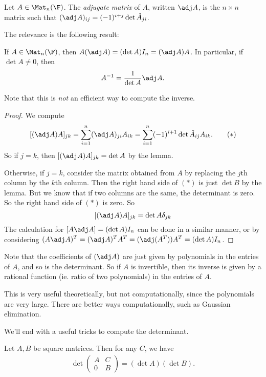 \documentclass[a4paper]{article}
\begin{document}
\begin{defi}
  Let $A \in \Mat_n(\F)$. The \emph{adjugate matrix} of $A$, written $\adj A$, is the $n\times n$ matrix such that $(\adj A)_{ij} = (-1)^{i + j} \det\hat{A}_{ji}$.
\end{defi}

The relevance is the following result:
\begin{thm}
  If $A \in \Mat_n(\F)$, then $A(\adj A) = (\det A) I_n = (\adj A)A$. In particular, if $\det A \not= 0$, then
  \[
    A^{-1} = \frac{1}{\det A}\adj A.
  \]
\end{thm}
Note that this is \emph{not} an efficient way to compute the inverse.

\begin{proof}
  We compute
  \[
    [(\adj A)A]_{jk} = \sum_{i = 1}^n (\adj A)_{ji} A_{ik} = \sum_{i = 1}^n (-1)^{i + 1} \det\hat{A}_{ij} A_{ik}.\tag{$*$}
  \]
  So if $j = k$, then $[(\adj A)A]_{jk} = \det A$ by the lemma.

  Otherwise, if $j = k$, consider the matrix obtained from $A$ by replacing the $j$th column by the $k$th column. Then the right hand side of $(*)$ is just $\det B$ by the lemma. But we know that if two columns are the same, the determinant is zero. So the right hand side of $(*)$ is zero. So
  \[
    [(\adj A)A]_{jk} = \det A \delta_{jk}
  \]
  The calculation for $[A\adj A] = (\det A) I_n$ can be done in a similar manner, or by considering $(A\adj A)^T = (\adj A)^T A^T = (\adj (A^T)) A^T = (\det A) I_n$.
\end{proof}
Note that the coefficients of $(\adj A)$ are just given by polynomials in the entries of $A$, and so is the determinant. So if $A$ is invertible, then its inverse is given by a rational function (ie. ratio of two polynomials) in the entries of $A$.

This is very useful theoretically, but not computationally, since the polynomials are very large. There are better ways computationally, such as Gaussian elimination.

We'll end with a useful tricks to compute the determinant.
\begin{lemma}
  Let $A, B$ be square matrices. Then for any $C$, we have
  \begin{align*}
    \det
    \begin{pmatrix}
      A & C\\
      0 & B
    \end{pmatrix}
    = (\det A) (\det B).
  \end{align*}
\end{lemma}
\end{document}
